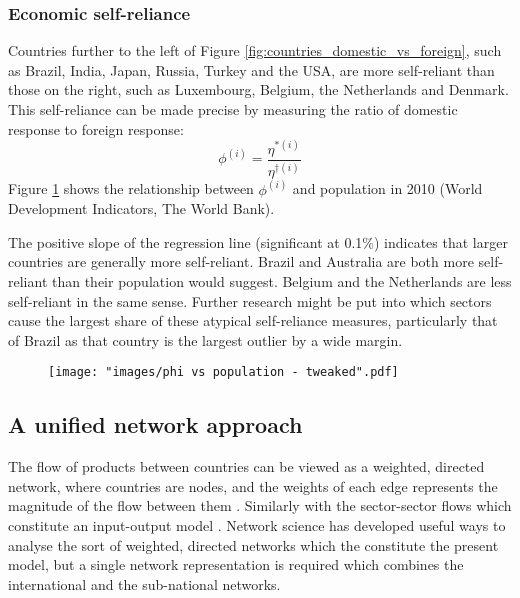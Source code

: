 \documentclass[a4paper]{article}
\begin{document}
\subsubsection*{Economic self-reliance}
Countries further to the left of Figure \ref{fig:countries_domestic_vs_foreign}, such as Brazil, India, Japan, Russia, Turkey and the USA, are more self-reliant than those on the right, such as Luxembourg, Belgium, the Netherlands and Denmark.
This self-reliance can be made precise by measuring the ratio of domestic response to foreign response:
\begin{equation}
\phi^{(i)} = \frac{\eta^{*(i)}}{\eta^{\dagger(i)}}
\end{equation}
Figure \ref{fig:phi-vs-pop} shows the relationship between $\phi^{(i)}$ and population in 2010 (World Development Indicators, The World Bank).

The positive slope of the regression line (significant at 0.1\%) indicates that larger countries are generally more self-reliant.
Brazil and Australia are both more self-reliant than their population would suggest.
Belgium and the Netherlands are less self-reliant in the same sense.
Further research might be put into which sectors cause the largest share of these atypical self-reliance measures, particularly that of Brazil as that country is the largest outlier by a wide margin.

\begin{figure}[tb]
\centering
\texttt{[image: "images/phi vs population - tweaked".pdf]}
\caption{}
\label{fig:phi-vs-pop}
\end{figure}

\subsection{A unified network approach}\label{sec:networkapproach}
The flow of products between countries can be viewed as a weighted, directed network, where countries are nodes, and the weights of each edge represents the magnitude of the flow between them \parencite{nystuen_graph_1961,serrano_topology_2003,bhattacharya_international_2008,baskaran_heckscher-ohlin_2011}.
Similarly with the sector-sector flows which constitute an input-output model \parencite{blochl_vertex_2011,fedriani_simplifying_2012}.
Network science has developed useful ways to analyse the sort of weighted, directed networks which the constitute the present model, but a single network representation is required which combines the international and the sub-national networks.
\end{document}
